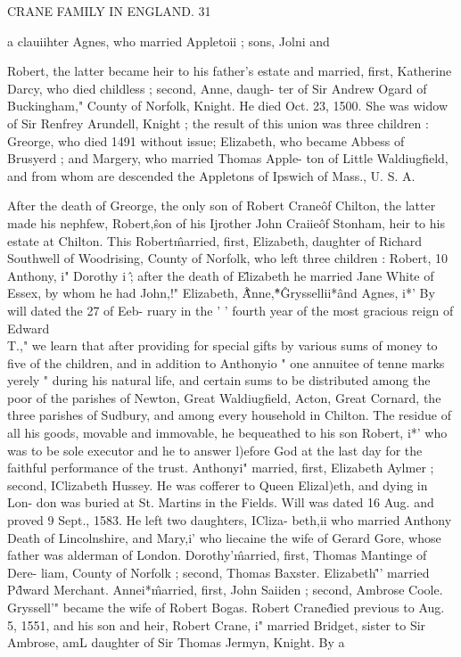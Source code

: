 CRANE FAMILY IN ENGLAND. 31 

a clauiihter Agnes, who married Appletoii ; sons, Jolni and 

Robert, the latter became heir to his father's estate and married, 
first, Katherine Darcy, who died childless ; second, Anne, daugh- 
ter of Sir Andrew Ogard of Buckingham," County of Norfolk, 
Knight. He died Oct. 23, 1500. She was widow of Sir Renfrey 
Arundell, Knight ; the result of this union was three children : 
Greorge, who died 1491 without issue; Elizabeth, who became 
Abbess of Brusyerd ; and Margery, who married Thomas Apple- 
ton of Little Waldiugfield, and from whom are descended the 
Appletons of Ipswich of Mass., U. S. A. 

After the death of Greorge, the only son of Robert Crane\^ of 
Chilton, the latter made his nephfew, Robert,\^ son of his Ijrother 
John Craiie\^ of Stonham, heir to his estate at Chilton. This 
Robert\^ married, first, Elizabeth, daughter of Richard Southwell 
of Woodrising, County of Norfolk, who left three children : 
Robert, 10 Anthony, i" Dorothy i \^ ; after the death of E\^lizabeth he 
married Jane White of Essex, by whom he had John,!" Elizabeth, \^\^\^ 
Anne,\^*\^ Gryssellii*\^ and Agnes, i*' By will dated the 27 of Eeb- 
ruary in the ' ' fourth year of the most gracious reign of Edward 
\\T.," we learn that after providing for special gifts by various 
sums of money to five of the children, and in addition to Anthonyio 
" one annuitee of tenne marks yerely " during his natural life, and 
certain sums to be distributed among the poor of the parishes of 
Newton, Great Waldiugfield, Acton, Great Cornard, the three 
parishes of Sudbury, and among every household in Chilton. The 
residue of all his goods, movable and immovable, he bequeathed 
to his son Robert, i*' who was to be sole executor and he to answer 
l)efore God at the last day for the faithful performance of the trust. 
Anthonyi" married, first, Elizabeth Aylmer ; second, IClizabeth 
Hussey. He was cofferer to Queen Elizal)eth, and dying in Lon- 
don was buried at St. Martins in the Fields. Will was dated 16 
Aug. and proved 9 Sept., 1583. He left two daughters, ICliza- 
beth,ii who married Anthony Death of Lincolnshire, and Mary,i' 
who liecaine the wife of Gerard Gore, whose father was alderman 
of London. Dorothy'\^ married, first, Thomas Mantinge of Dere- 
liam, County of Norfolk ; second, Thomas Baxster. Elizabeth\^'' 
married P\^dward Merchant. Annei*\^ married, first, John Saiiden ; 
second, Ambrose Coole. Gryssell'" became the wife of Robert 
Bogas. Robert Crane\^ died previous to Aug. 5, 1551, and his 
son and heir, Robert Crane, i" married Bridget, sister to Sir 
Ambrose, amL daughter of Sir Thomas Jermyn, Knight. By a 



